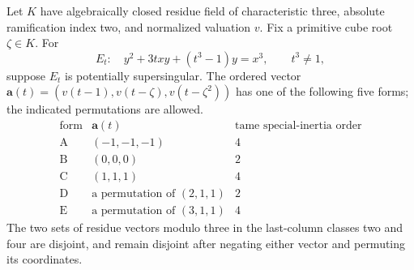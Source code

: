 \begin{lemma}
\label{lem:B-RD37-patterns}
Let $K$ have algebraically closed residue field of characteristic three,
absolute ramification index two, and normalized valuation $v$.
Fix a primitive cube root $\zeta\in K$. For
\[
 E_t:\quad y^2+3txy+(t^3-1)y=x^3,\qquad t^3\ne1,
                                                        \tag{B-RD37.1}
\]
suppose $E_t$ is potentially supersingular. The ordered vector
$\boldsymbol a(t)=(v(t-1),v(t-\zeta),v(t-\zeta^2))$ has one
of the following five forms; the indicated permutations are allowed.
\[
\begin{array}{c|c|c}
\text{form}&\boldsymbol a(t)&\text{tame special-inertia order}\\\hline
\mathrm A&(-1,-1,-1)&4\\
\mathrm B&(0,0,0)&2\\
\mathrm C&(1,1,1)&4\\
\mathrm D&\text{a permutation of }(2,1,1)&2\\
\mathrm E&\text{a permutation of }(3,1,1)&4
\end{array}                                             \tag{B-RD37.2}
\]
The two sets of residue vectors modulo three in the last-column
classes two and four are disjoint, and remain disjoint after negating
either vector and permuting its coordinates.
\end{lemma}
